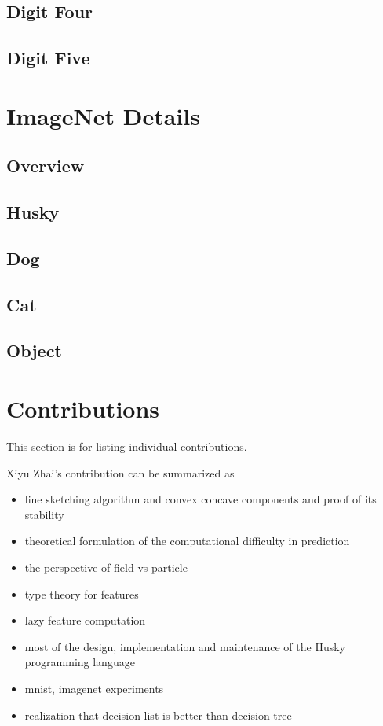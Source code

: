 \documentclass[11pt]{article} 	%
\theoremstyle{definition}
\begin{document}
\subsection{Digit Four}

\subsection{Digit Five}

\section{ImageNet Details}

\subsection{Overview}

\subsection{Husky}

\subsection{}

\subsection{Dog}

\subsection{Cat}

\subsection{Object}

\section{Contributions}

This section is for listing individual contributions.

Xiyu Zhai's contribution can be summarized as
\begin{itemize}
	\item line sketching algorithm and convex concave components and proof of its stability
	\item theoretical formulation of the computational difficulty in prediction
	\item the perspective of field vs particle
	\item type theory for features
	\item lazy feature computation
	\item most of the design, implementation and maintenance of the Husky programming language
	\item mnist, imagenet experiments
	\item realization that decision list is better than decision tree
\end{itemize}
\end{document}
